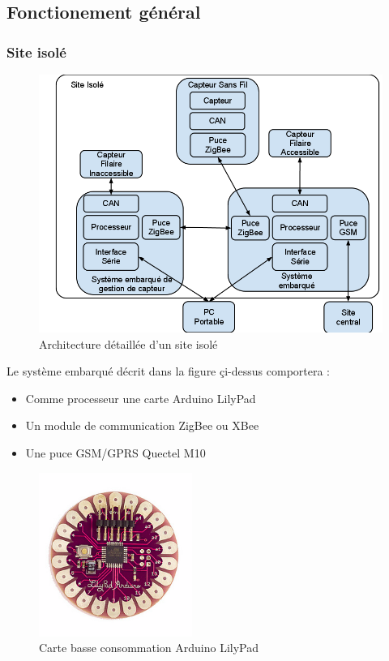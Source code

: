 \documentclass{mise_en_page}
\begin{document}
\subsection{Fonctionement général}

\subsubsection{Site isolé}

\begin{figure}[H]
	\centering
	\includegraphics[width=150mm]{site_isole.png}
	\caption{Architecture détaillée d'un site isolé}
\end{figure}

Le système embarqué décrit dans la figure çi-dessus comportera :

\begin{itemize}
	\item Comme processeur une carte Arduino LilyPad
	\item Un module de communication ZigBee ou XBee
	\item Une puce GSM/GPRS Quectel M10
\end{itemize}

\begin{figure}[H]
	\centering
	\includegraphics[width=50mm]{arduino.png}
	\caption{Carte basse consommation Arduino LilyPad}
\end{figure}
\end{document}
